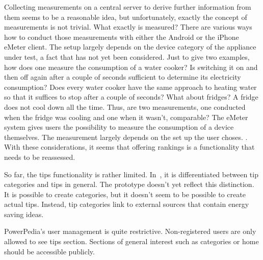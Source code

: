 Collecting measurements on a central server to derive further information from them seems to be a reasonable idea, but unfortunately, exactly the concept of measurements is not trivial. What exactly is measured?    
There are various ways how to conduct those measurements with either the Android or the iPhone eMeter client. The setup largely depends on the device category of the appliance under test, a fact that has not yet been considered. Just to give two examples, how does one measure the consumption of a water cooker? Is switching it on and then off again after a couple of seconds sufficient to determine its electricity consumption? Does every water cooker have the same approach to heating water so that it suffices to stop after a couple of seconds? What about fridges? A fridge does not cool down all the time. Thus, are two measurements, one conducted when the fridge was cooling and one when it wasn't, comparable? 
The eMeter system gives users the possibility to measure the consumption of a device themselves. 
The measurement largely depends on the set up the user choses. .
With these considerations, it seems that offering rankings is a functionality that needs to be reassessed. 

So far, the tips functionality is rather limited. In~\cite{merklepp}, it is differentiated between tip categories and tips in general. The prototype doesn't yet reflect this distinction. It is possible to create categories, but it doesn't seem to be possible to create actual tips. Instead, tip categories link to external sources that contain energy saving ideas. 
 
PowerPedia's user management is quite restrictive. Non-registered users are only allowed to see tips section. Sections of general interest such as categories or home should be accessible publicly. 

